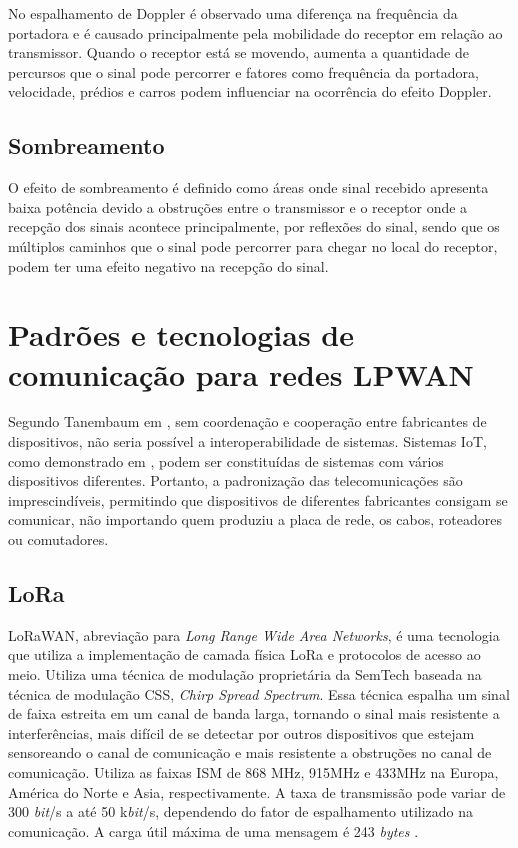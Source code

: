 No espalhamento de Doppler é observado uma diferença na frequência da portadora e é causado principalmente pela mobilidade do receptor em relação ao transmissor. Quando o receptor está se movendo, aumenta a quantidade de percursos que o sinal pode percorrer e fatores como frequência da portadora, velocidade, prédios e carros podem influenciar na ocorrência do efeito Doppler.


\subsection*{Sombreamento}
O efeito de sombreamento é definido como áreas onde sinal recebido apresenta baixa potência devido a obstruções entre o transmissor e o receptor onde a recepção dos sinais acontece principalmente, por reflexões do sinal, sendo que os múltiplos caminhos que o sinal pode percorrer para chegar no local do receptor, podem ter uma efeito negativo na recepção do sinal.


\section{Padrões e tecnologias de comunicação para redes LPWAN}
\label{padrõesSF}
Segundo Tanembaum em \cite{tanembaum2011}, sem coordenação e cooperação entre fabricantes de dispositivos, não seria possível a interoperabilidade de sistemas. Sistemas IoT, como demonstrado em \cite{sotres2017practical}, podem ser constituídas de sistemas com vários dispositivos diferentes. Portanto, a padronização das telecomunicações são imprescindíveis, permitindo que dispositivos de diferentes fabricantes consigam se comunicar, não importando quem produziu a placa de rede, os cabos, roteadores ou comutadores.

\subsection{LoRa}
LoRaWAN, abreviação para \emph{Long Range Wide Area Networks}, é uma tecnologia que utiliza a implementação de camada física LoRa e protocolos de acesso ao meio. Utiliza uma técnica de modulação proprietária da SemTech baseada na técnica de modulação CSS, \emph{Chirp Spread Spectrum}. Essa técnica espalha um sinal de faixa estreita em um canal de banda larga, tornando o sinal mais resistente a interferências, mais difícil de se detectar por outros dispositivos que estejam sensoreando o canal de comunicação e mais resistente a obstruções no canal de comunicação. Utiliza as faixas ISM de 868 MHz, 915MHz e 433MHz na Europa, América do Norte e Asia, respectivamente. A taxa de transmissão pode variar de 300 \emph{bit}/s a até 50 k\emph{bit}/s, dependendo do fator de espalhamento utilizado na comunicação. A carga útil máxima de uma mensagem é 243 \emph{bytes} \cite{mekki2019comparative}.

